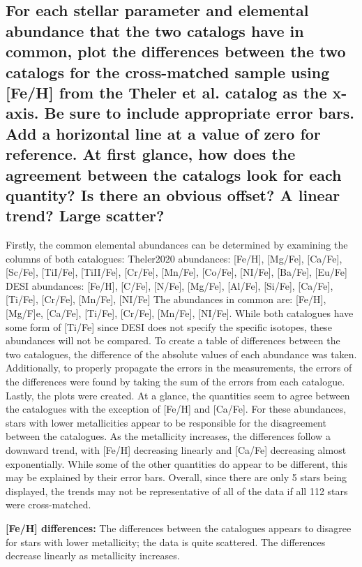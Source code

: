 \documentclass{article}
\begin{document}
\subsection{For each stellar parameter and elemental abundance that the two catalogs have in common, plot the differences between the two catalogs for the cross-matched sample using [Fe/H] from the Theler et al. catalog as the x-axis. Be sure to include appropriate error bars. Add a horizontal line at a value of zero for reference. At first glance, how does the agreement between the catalogs look for each quantity? Is there an obvious offset? A linear trend? Large scatter?}
Firstly, the common elemental abundances can be determined by examining the columns of both catalogues:
\newline Theler2020 abundances: [Fe/H], [Mg/Fe], [Ca/Fe], [Sc/Fe], [TiI/Fe], [TiII/Fe], [Cr/Fe], [Mn/Fe], [Co/Fe], [NI/Fe], [Ba/Fe], [Eu/Fe]
\newline DESI abundances: [Fe/H], [C/Fe], [N/Fe], [Mg/Fe], [Al/Fe], [Si/Fe], [Ca/Fe], [Ti/Fe], [Cr/Fe], [Mn/Fe], [NI/Fe]
\newline The abundances in common are: [Fe/H], [Mg/F]e, [Ca/Fe], [Ti/Fe], [Cr/Fe], [Mn/Fe], [NI/Fe]. While both catalogues have some form of [Ti/Fe] since DESI does not specify the specific isotopes, these abundances will not be compared. To create a table of differences between the two catalogues, the difference of the absolute values of each abundance was taken. Additionally, to properly propagate the errors in the measurements, the errors of the differences were found by taking the sum of the errors from each catalogue. Lastly, the plots were created. At a glance, the quantities seem to agree between the catalogues with the exception of [Fe/H] and [Ca/Fe]. For these abundances, stars with lower metallicities appear to be responsible for the disagreement between the catalogues. As the metallicity increases, the differences follow a downward trend, with [Fe/H] decreasing linearly and [Ca/Fe] decreasing almost exponentially. While some of the other quantities do appear to be different, this may be explained by their error bars. 
\newline Overall, since there are only 5 stars being displayed, the trends may not be representative of all of the data if all 112 stars were cross-matched.\newline

\textbf{[Fe/H] differences:} The differences between the catalogues appears to disagree for stars with lower metallicity; the data is quite scattered. The differences decrease linearly as metallicity increases.
\end{document}
